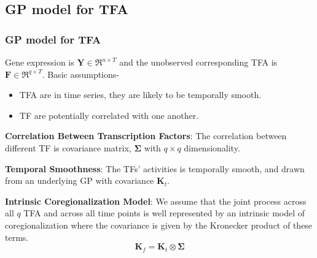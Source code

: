 \documentclass{beamer}
\begin{document}
\subsection{GP model for TFA}
\begin{frame}
\frametitle{GP model for TFA}

Gene expression is $\mathbf{Y} \in \Re^{n\times T}$ and the unobserved corresponding TFA is $\mathbf{F}\in\Re^{q\times T}$.
Basic assumptions-
\begin{itemize}
\item TFA are in time series, they are likely to be temporally smooth. 
\item TF are potentially correlated with one another.
\end{itemize} 

\textbf{Correlation Between Transcription Factors}:  
The correlation between different TF is covariance matrix, $\boldsymbol{\Sigma}$ with $q\times q$ dimensionality. 

\textbf{Temporal Smoothness}: 
The TFs' activities is temporally smooth, and drawn from an underlying GP with covariance $\mathbf{K}_t$. 

\textbf{Intrinsic Coregionalization Model}: 
We assume that the joint process across all $q$ TFA and across all time points is well represented by an intrinsic model of coregionalization where the covariance is given by the 
Kronecker product of these terms.
\begin{equation} \label{eq:K}
  \mathbf{K}_f = \mathbf{K}_t \otimes \boldsymbol{\Sigma}
\end{equation}

\end{frame}
\end{document}
